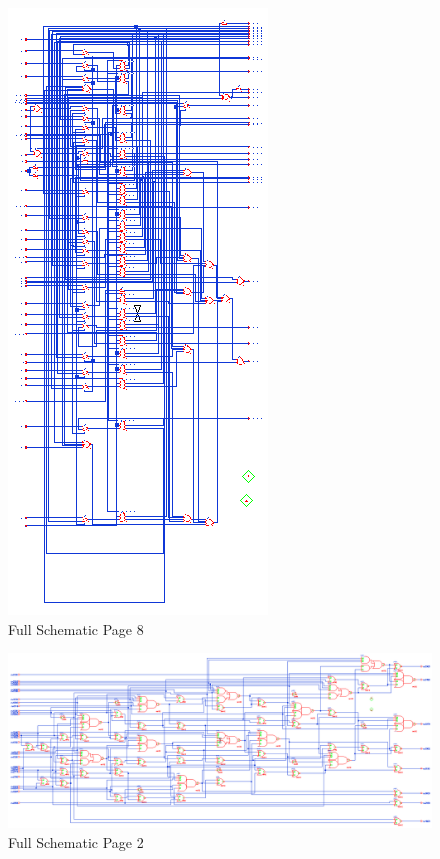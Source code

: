 \documentclass[11pt]{article}
\begin{document}
	
	\begin{figure}[H] 
		\centering 
		\includegraphics[width=0.7\linewidth]{"Pictures/Full Schematic Page 8"}
		\caption{Full Schematic Page 8} 
		\label{fig:Full-Schematic-Page-8} 
	\end{figure}
	
	
	\begin{figure}[H] 
		\centering 
		\includegraphics[width=0.7\linewidth]{"Pictures/Full Schematic Page 2"}
		\caption{Full Schematic Page 2} 
		\label{fig:Full-Schematic-Page-2} 
	\end{figure}
	
\end{document}
